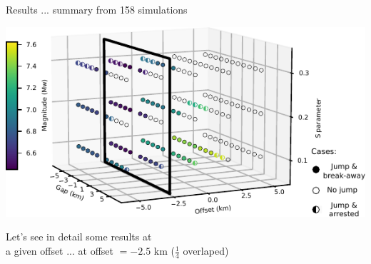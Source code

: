 \documentclass{beamer}
\begin{document}
\begin{frame}
 {Results ... summary from 158 simulations}

  \vskip 0.5cm
  \includegraphics[width=1\linewidth]{images/tests_shmax340_1plane}
  
  \begin{center}
   Let's see in detail some results at \\
   a given offset ... at offset $=-2.5$ km ($\frac{1}{4}$ overlaped) 
  \end{center}

  
   \addtocounter{framenumber}{-1}

\end{frame}
\end{document}
